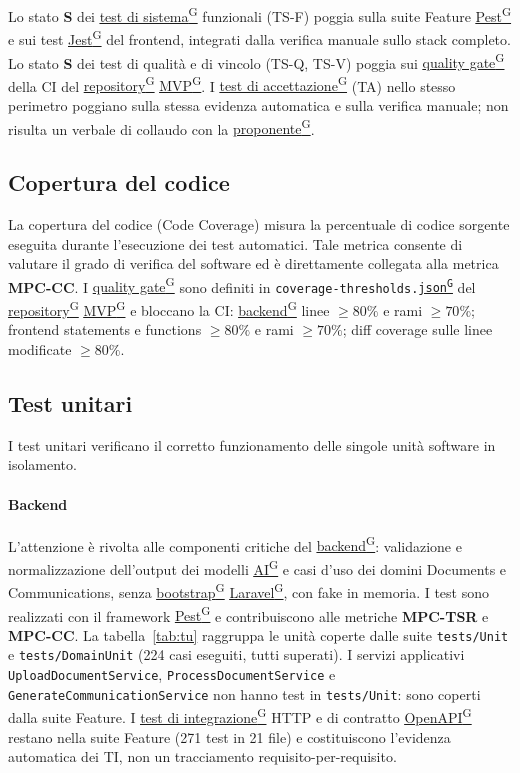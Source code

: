 \documentclass[a4paper,12pt]{article}
\providecommand{\glslink}[2]{\href{https://alittlebyte-19.github.io/Documentazione/glossario.html\#gls-#1}{\underline{#2}\textsuperscript{\scriptsize G}}}
\begin{document}
Lo stato \textbf{S} dei \glslink{test-di-sistema}{test di sistema} funzionali (TS-F) poggia sulla suite Feature \glslink{pest}{Pest} e sui test \glslink{jest}{Jest} del frontend, integrati dalla verifica manuale sullo stack completo. Lo stato \textbf{S} dei test di qualità e di vincolo (TS-Q, TS-V) poggia sui \glslink{quality-gate}{quality gate} della CI del \glslink{repository}{repository} \glslink{mvp-minimum-viable-product}{MVP}. I \glslink{test-di-accettazione}{test di accettazione} (TA) nello stesso perimetro poggiano sulla stessa evidenza automatica e sulla verifica manuale; non risulta un verbale di collaudo con la \glslink{committente-proponente}{proponente}.

\subsection{Copertura del codice}
La copertura del codice (Code Coverage) misura la percentuale di codice sorgente eseguita durante l'esecuzione dei test automatici. Tale metrica consente di valutare il grado di verifica del software ed è direttamente collegata alla metrica \textbf{MPC-CC}.
I \glslink{quality-gate}{quality gate} sono definiti in \texttt{coverage-thresholds.\glslink{json}{json}} del \glslink{repository}{repository} \glslink{mvp-minimum-viable-product}{MVP} e bloccano la CI: \glslink{backend}{backend} linee $\geq 80\%$ e rami $\geq 70\%$; frontend statements e functions $\geq 80\%$ e rami $\geq 70\%$; diff coverage sulle linee modificate $\geq 80\%$.

\subsection{Test unitari}
I test unitari verificano il corretto funzionamento delle singole unità software in isolamento.

\paragraph{Backend}
L'attenzione è rivolta alle componenti critiche del \glslink{backend}{backend}: validazione e normalizzazione dell'output dei modelli \glslink{intelligenza-artificiale-ai}{AI} e casi d'uso dei domini Documents e Communications, senza \glslink{bootstrap}{bootstrap} \glslink{laravel}{Laravel}, con fake in memoria. I test sono realizzati con il framework \glslink{pest}{Pest} e contribuiscono alle metriche \textbf{MPC-TSR} e \textbf{MPC-CC}. La tabella~\ref{tab:tu} raggruppa le unità coperte dalle suite \texttt{tests/Unit} e \texttt{tests/DomainUnit} (224 casi eseguiti, tutti superati). I servizi applicativi \texttt{UploadDocumentService}, \texttt{ProcessDocumentService} e \texttt{GenerateCommunicationService} non hanno test in \texttt{tests/Unit}: sono coperti dalla suite Feature. I \glslink{test-di-integrazione}{test di integrazione} HTTP e di contratto \glslink{openapi}{OpenAPI} restano nella suite Feature (271 test in 21 file) e costituiscono l'evidenza automatica dei TI, non un tracciamento requisito-per-requisito.
\end{document}
